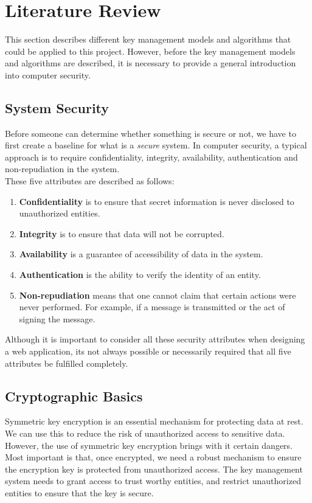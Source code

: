 \documentclass[11pt, a4paper, notitlepage]{article}
\begin{document}
\makeblankpage


\section{Literature Review}
This section describes different key management models and algorithms that could be applied to this project. However, before the key management models and algorithms are described, it is necessary to provide a general introduction into computer security. 

\subsection*{System Security}
Before someone can determine whether something is secure or not, we have to first create a baseline for what is a \emph{secure} system. In computer security, a typical approach is to require confidentiality, integrity, availability, authentication and non-repudiation in the system\cite{Pfleeger:2006:SC:1177321}. \\

These five attributes are described as follows:

\begin{enumerate}
\item \textbf{Confidentiality} is to ensure that secret information is never disclosed to unauthorized entities.
\item \textbf{Integrity} is to ensure that data will not be corrupted.
\item \textbf{Availability} is a guarantee of accessibility of data in the system.
\item \textbf{Authentication} is the ability to verify the identity of an entity.
\item \textbf{Non-repudiation} means that one cannot claim that certain actions were never performed. For example, if a message is transmitted or the act of signing the message.
\end{enumerate}

Although it is important to consider all these security attributes when designing a web application, its not always possible or necessarily required that all five attributes be fulfilled completely.


\subsection*{Cryptographic Basics}
Symmetric key encryption is an essential mechanism for protecting data at rest. We can use this to reduce the risk of unauthorized access to sensitive data. However, the use of symmetric key encryption brings with it certain dangers. Most important is that, once encrypted, we need a robust mechanism to ensure the encryption key is protected from unauthorized access. The key management system needs to grant access to trust worthy entities, and restrict unauthorized entities to ensure that the key is secure. \\
\end{document}
